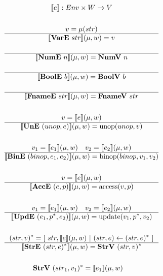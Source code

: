 \begin{gather*}
  \sem{e} : Env \times W \rightarrow V \\
%
\newline \\
  v = \mu(str) \\
  \hline
  \sem{\vare ~ str}(\mu, w) = v \\
%
\newline \\
  \hline
  \sem{\nume ~ n}(\mu, w) = \numv ~ n \\
%
\newline \\
  \hline
  \sem{\boole ~ b}(\mu, w) = \boolv ~ b \\
%
\newline \\
  \hline
  \sem{\fnamee ~ str}(\mu, w) = \fnamev ~ str \\
%
\newline \\
  v = \sem{e}(\mu, w) \\
  \hline
  \sem{\une ~ (unop, e)}(\mu, w) = \unop(unop, v) \\
%
\newline \\
  v_1 = \sem{e_1}(\mu, w) \quad v_2 = \sem{e_2}(\mu, w) \\
  \hline
  \sem{\bine ~ (binop, e_1, e_2)}(\mu, w) = \binop(binop, v_1, v_2) \\
%
\newline \\
  v = \sem{e}(\mu, w) \\
  \hline
  \sem{\acce ~ (e, p)}(\mu, w) = \access(v, p) \\
%
\newline \\
  v_1 = \sem{e_1}(\mu, w) \quad v_2 = \sem{e_2}(\mu, w) \\
  \hline
  \sem{\upde ~ (e_1, \seq p, e_2)}(\mu, w) = \update(v_1, \seq p, v_2) \\
%
\newline \\
  \seq{(str, v)} = [ ~ str, \sem{e}(\mu, w) ~ | ~  (str, e) \leftarrow \seq{(str, e)} ~ ] \\
  \hline
  \sem{\stre ~ \seq{(str, e)}}(\mu, w) = \strv ~ \seq{(str, v)} \\
%
\newline \\
  \strv ~ \seq{(str_1, v_1)} = \sem{e_1}(\mu, w) \quad

\end{gather*}
